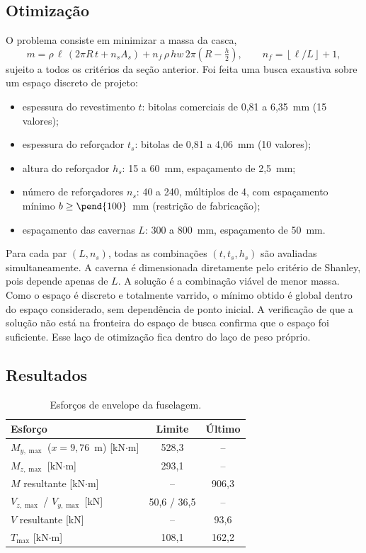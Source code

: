 \subsection{Otimização}
 
O problema consiste em minimizar a massa da casca,
\begin{equation}
  m = \rho\,\ell\,\left(2\pi R\,t + n_s A_s\right) + n_f\,\rho\, h w\, 2\pi\!\left(R - \tfrac{h}{2}\right), \qquad n_f = \left\lfloor \ell/L \right\rfloor + 1,
\end{equation}
sujeito a todos os critérios da seção anterior. Foi feita uma busca exaustiva sobre um espaço discreto de projeto:
 
\begin{itemize}
  \item espessura do revestimento $t$: bitolas comerciais de 0,81 a 6,35~mm (15 valores);
  \item espessura do reforçador $t_s$: bitolas de 0,81 a 4,06~mm (10 valores);
  \item altura do reforçador $h_s$: 15 a 60~mm, espaçamento de 2,5~mm;
  \item número de reforçadores $n_s$: 40 a 240, múltiplos de 4, com espaçamento mínimo $b \geq \pend{100}$~mm (restrição de fabricação);
  \item espaçamento das cavernas $L$: 300 a 800~mm, espaçamento de 50~mm.
\end{itemize}
 
Para cada par $(L, n_s)$, todas as combinações $(t, t_s, h_s)$ são avaliadas simultaneamente. A caverna é dimensionada diretamente pelo critério de Shanley, pois depende apenas de $L$. A solução é a combinação viável de menor massa. Como o espaço é discreto e totalmente varrido, o mínimo obtido é global dentro do espaço considerado, sem dependência de ponto inicial. A verificação de que a solução não está na fronteira do espaço de busca confirma que o espaço foi suficiente. Esse laço de otimização fica dentro do laço de peso próprio.
 
\subsection{Resultados}
 
\begin{table}[H]
  \centering
  \caption{Esforços de envelope da fuselagem.}
  \begin{tabular}{lcc}
    \toprule
    Esforço & Limite & Último \\
    \midrule
    $M_{y,\max}$ ($x = 9{,}76$~m) [kN$\cdot$m] & 528,3 & -- \\
    $M_{z,\max}$ [kN$\cdot$m]                 & 293,1 & -- \\
    $M$ resultante [kN$\cdot$m]               & --    & 906,3 \\
    $V_{z,\max}$ / $V_{y,\max}$ [kN]          & 50,6 / 36,5 & -- \\
    $V$ resultante [kN]                       & --    & 93,6 \\
    $T_{\max}$ [kN$\cdot$m]                   & 108,1 & 162,2 \\
    \bottomrule
  \end{tabular}
\end{table}
 
